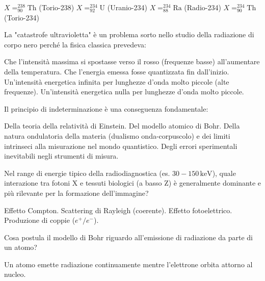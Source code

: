 \documentclass{exam}%
\begin{document}
\begin{questions}
\vspace{0.2em}%
\begin{multicols}{4}%
\begin{choices}%
\choice $X = ^{238}_{90}\text{Th}$ (Torio-238)%
\choice $X = ^{234}_{92}\text{U}$ (Uranio-234)%
\choice $X = ^{234}_{88}\text{Ra}$ (Radio-234)%
\choice $X = ^{234}_{90}\text{Th}$ (Torio-234)%
\end{choices}%
\end{multicols}%
\question La "catastrofe ultravioletta" è un problema sorto nello studio della radiazione di corpo nero perché la fisica classica prevedeva:%
\vspace{0.2em}%
\begin{choices}%
\choice Che l'intensità massima si spostasse verso il rosso (frequenze basse) all'aumentare della temperatura.%
\choice Che l'energia emessa fosse quantizzata fin dall'inizio.%
\choice Un'intensità energetica infinita per lunghezze d'onda molto piccole (alte frequenze).%
\choice Un'intensità energetica nulla per lunghezze d'onda molto piccole.%
\end{choices}%
\question Il principio di indeterminazione è una conseguenza fondamentale:%
\vspace{0.2em}%
\begin{choices}%
\choice Della teoria della relatività di Einstein.%
\choice Del modello atomico di Bohr.%
\choice Della natura ondulatoria della materia (dualismo onda-corpuscolo) e dei limiti intrinseci alla misurazione nel mondo quantistico.%
\choice Degli errori sperimentali inevitabili negli strumenti di misura.%
\end{choices}%
\question Nel range di energie tipico della radiodiagnostica (es. $30-150 \, \text{keV}$), quale interazione tra fotoni X e tessuti biologici (a basso Z) è generalmente dominante e più rilevante per la formazione dell'immagine?%
\vspace{0.2em}%
\begin{multicols}{2}%
\begin{choices}%
\choice Effetto Compton.%
\choice Scattering di Rayleigh (coerente).%
\choice Effetto fotoelettrico.%
\choice Produzione di coppie ($e^+/e^-$).%
\end{choices}%
\end{multicols}%
\question Cosa postula il modello di Bohr riguardo all'emissione di radiazione da parte di un atomo?%
\vspace{0.2em}%
\begin{choices}%
\choice Un atomo emette radiazione continuamente mentre l'elettrone orbita attorno al nucleo.%

\end{choices}
\end{questions}
\end{document}

